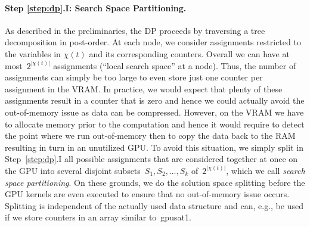 \documentclass{llncs}
\newcommand{\Card}[1]{|#1|}
\newcommand{\gpusatone}{{\small\textsf{gpusat1}}\xspace}
\begin{document}
\paragraph*{Step \ref{step:dp}.I: Search Space Partitioning.}
%
As described in the preliminaries, the DP proceeds by traversing a tree
decomposition in post-order. %
%
At each node, we consider assignments restricted to the variables in
$\chi(t)$ and its corresponding counters. Overall we can have at
most~$2^{\Card{\chi(t)}}$ assignments (``local search space'' at a
node). Thus, the number of assignments can simply be too large to even
store just one counter per assignment in the VRAM.
%
In practice, we would expect that plenty of these assignments result
in a counter that is zero and hence we could actually avoid the
out-of-memory issue as data can be compressed. However, on the VRAM we
have to allocate memory prior to the computation and hence it would
require to detect the point where we run out-of-memory then to copy the
data back to the RAM resulting in turn in an unutilized GPU.
%
To avoid this situation, we simply split in Step~\ref{step:dp}.I all
possible assignments that are considered together at once on the GPU
into several disjoint subsets~$S_1, S_2, \ldots, S_k$
of~$2^{\Card{\chi(t)}}$, which we call \emph{search space
  partitioning}.
%
%
%
%
On these grounds, we do the solution space splitting before the GPU kernels are
even executed to ensure that no out-of-memory issue occurs.
%
Splitting is independent of the actually used data structure and
can, e.g., be used if we store counters in an array similar to~\gpusatone.
%
\end{document}
